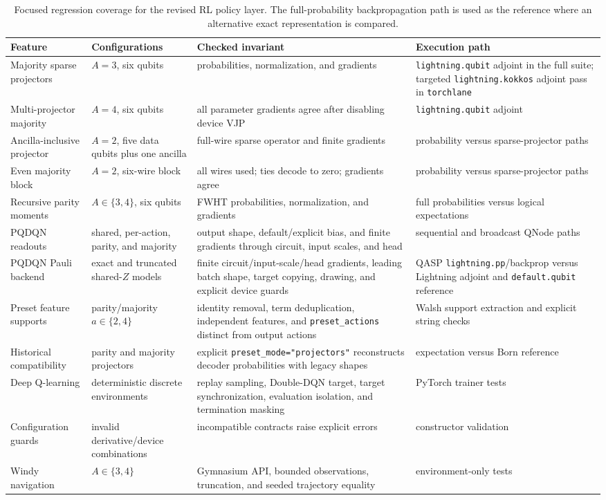 \documentclass[10pt]{article}
\newcommand{\code}[1]{\texttt{#1}}
\begin{document}
\begin{table}[H]
\centering
\caption{Focused regression coverage for the revised RL policy layer.  The
full-probability backpropagation path is used as the reference where an
alternative exact representation is compared.}
\label{tab:rl-validation}
\small
\begin{tabularx}{\textwidth}{@{}p{}p{}X p{}@{}}
\toprule
Feature & Configurations & Checked invariant & Execution path \\
\midrule
Majority sparse projectors & $A=3$, six qubits & probabilities, normalization, and gradients & \code{lightning.qubit} adjoint in the full suite; targeted \code{lightning.kokkos} adjoint pass in \code{torchlane} \\
Multi-projector majority & $A=4$, six qubits & all parameter gradients agree after disabling device VJP & \code{lightning.qubit} adjoint \\
Ancilla-inclusive projector & $A=2$, five data qubits plus one ancilla & full-wire sparse operator and finite gradients & probability versus sparse-projector paths \\
Even majority block & $A=2$, six-wire block & all wires used; ties decode to zero; gradients agree & probability versus sparse-projector paths \\
Recursive parity moments & $A\in\{3,4\}$, six qubits & FWHT probabilities, normalization, and gradients & full probabilities versus logical expectations \\
PQDQN readouts & shared, per-action, parity, and majority & output shape, default/explicit bias, and finite gradients through circuit, input scales, and head & sequential and broadcast QNode paths \\
PQDQN Pauli backend & exact and truncated shared-$Z$ models & finite circuit/input-scale/head gradients, leading batch shape, target copying, drawing, and explicit device guards & QASP \code{lightning.pp}/backprop versus Lightning adjoint and \code{default.qubit} reference \\
Preset feature supports & parity/majority $a\in\{2,4\}$ & identity removal, term deduplication, independent features, and \code{preset\_actions} distinct from output actions & Walsh support extraction and explicit string checks \\
Historical compatibility & parity and majority projectors & explicit \code{preset\_mode="projectors"} reconstructs decoder probabilities with legacy shapes & expectation versus Born reference \\
Deep Q-learning & deterministic discrete environments & replay sampling, Double-DQN target, target synchronization, evaluation isolation, and termination masking & PyTorch trainer tests \\
Configuration guards & invalid derivative/device combinations & incompatible contracts raise explicit errors & constructor validation \\
Windy navigation & $A\in\{3,4\}$ & Gymnasium API, bounded observations, truncation, and seeded trajectory equality & environment-only tests \\
\bottomrule
\end{tabularx}
\end{table}
\end{document}
